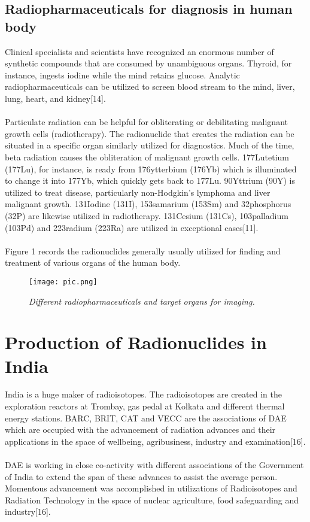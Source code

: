 \documentclass[12pt]{article}
\begin{document}
\subsection{Radiopharmaceuticals for diagnosis in human body}
Clinical specialists and scientists have recognized an enormous number of synthetic compounds that are consumed by unambiguous organs. Thyroid, for instance, ingests iodine while the mind retains glucose. Analytic radiopharmaceuticals can be utilized to screen blood stream to the mind, liver, lung, heart, and kidney[14].
\\
\\
Particulate radiation can be helpful for obliterating or debilitating malignant growth cells (radiotherapy). The radionuclide that creates the radiation can be situated in a specific organ similarly utilized for diagnostics. Much of the time, beta radiation causes the obliteration of malignant growth cells. 177Lutetium (177Lu), for instance, is ready from 176ytterbium (176Yb) which is illuminated to change it into 177Yb, which quickly gets back to 177Lu. 90Yttrium (90Y) is utilized to treat disease, particularly non-Hodgkin's lymphoma and liver malignant growth. 131Iodine (131I), 153samarium (153Sm) and 32phosphorus (32P) are likewise utilized in radiotherapy. 131Cesium (131Cs), 103palladium (103Pd) and 223radium (223Ra) are utilized in exceptional cases[11].
\\
\\
Figure 1 records the radionuclides generally usually utilized for finding and treatment of various organs of the human body.
\begin{figure}[htp]
    \centering
    \texttt{[image: pic.png]}
    \caption{\textit{Different radiopharmaceuticals and target organs for imaging.}}
    \label{fig:1}
\end{figure}
\section{Production of Radionuclides in India}
India is a huge maker of radioisotopes. The radioisotopes are created in the exploration reactors at Trombay, gas pedal at Kolkata and different thermal energy stations. BARC, BRIT, CAT and VECC are the associations of DAE which are occupied with the advancement of radiation advances and their applications in the space of wellbeing, agribusiness, industry and examination[16].
\\
\\
DAE is working in close co-activity with different associations of the Government of India to extend the span of these advances to assist the average person. Momentous advancement was accomplished in utilizations of Radioisotopes and Radiation Technology in the space of nuclear agriculture, food safeguarding and industry[16].
\end{document}
